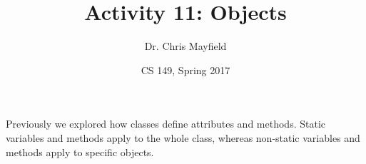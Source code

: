 \documentclass[12pt]{article}
\title{Activity 11: Objects}
\author{Dr. Chris Mayfield}
\date{CS 149, Spring 2017}
\begin{document}
\maketitle

Previously we explored how classes define attributes and methods.
Static variables and methods apply to the whole class, whereas non-static variables and methods apply to specific objects.



\end{document}
